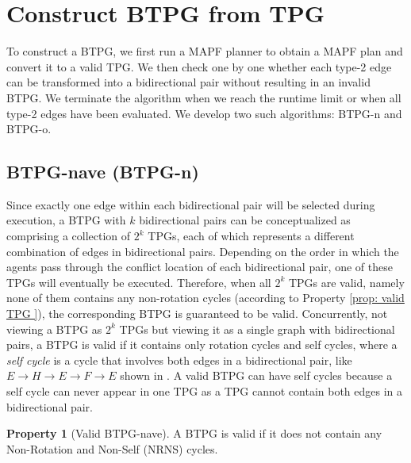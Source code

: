 \documentclass[letterpaper]{article} %
\theoremstyle{definition}
\newtheorem{property}{Property}
\begin{document}
\section{Construct BTPG from TPG}
To construct a BTPG, we first run a MAPF planner to obtain a MAPF plan and convert it to a valid TPG. We then check one by one whether each type-2 edge can be transformed into a bidirectional pair without resulting in an invalid BTPG. We terminate the algorithm when we reach the runtime limit or when all type-2 edges have been evaluated. We develop two such algorithms: BTPG-n and BTPG-o.

\subsection{BTPG-nave (BTPG-n)}
Since exactly one edge within each bidirectional pair will be selected during execution, a BTPG with $k$ bidirectional pairs can be conceptualized as comprising a collection of $2^k$ TPGs, each of which represents a different combination of edges in bidirectional pairs. Depending on the order in which the agents pass through the conflict location of each bidirectional pair, one of these TPGs will eventually be executed. Therefore, when all $2^k$ TPGs are valid, namely none of them contains any non-rotation cycles (according to Property \ref{prop: valid TPG }), the corresponding BTPG is guaranteed to be valid. Concurrently, not viewing a BTPG as $2^k$ TPGs but viewing it as a single graph with bidirectional pairs, a BTPG is valid if it contains only rotation cycles and self cycles, where a \emph{self cycle} is a cycle that involves both edges in a bidirectional pair, like $E\rightarrow H \rightarrow E \rightarrow F \rightarrow E$ shown in . A valid BTPG can have self cycles because a self cycle can never appear in one TPG as a TPG cannot contain both edges in a bidirectional pair.

\begin{property}[Valid BTPG-nave]
\label{prop: valid BTPG - naive}
    A BTPG is valid if it does not contain any Non-Rotation and Non-Self (NRNS) cycles.
\end{property}
\end{document}
